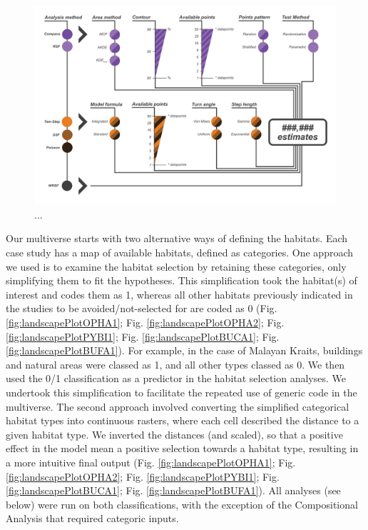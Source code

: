 \documentclass[10pt,a4paper]{article}
\begin{document}
\begin{figure}
\includegraphics[width=1\linewidth]{../ext_images/decisions_visual} \caption{...}\label{fig:decisionsFigure}
\end{figure}

Our multiverse starts with two alternative ways of defining the habitats.
Each case study has a map of available habitats, defined as categories.
One approach we used is to examine the habitat selection by retaining these categories, only simplifying them to fit the hypotheses.
This simplification took the habitat(s) of interest and codes them as 1, whereas all other habitats previously indicated in the studies to be avoided/not-selected for are coded as 0 (Fig. \ref{fig:landscapePlotOPHA1}; Fig. \ref{fig:landscapePlotOPHA2}; Fig. \ref{fig:landscapePlotPYBI1}; Fig. \ref{fig:landscapePlotBUCA1}; Fig. \ref{fig:landscapePlotBUFA1}).
For example, in the case of Malayan Kraits, buildings and natural areas were classed as 1, and all other types classed as 0.
We then used the 0/1 classification as a predictor in the habitat selection analyses.
We undertook this simplification to facilitate the repeated use of generic code in the multiverse.
The second approach involved converting the simplified categorical habitat types into continuous rasters, where each cell described the distance to a given habitat type.
We inverted the distances (and scaled), so that a positive effect in the model mean a positive selection towards a habitat type, resulting in a more intuitive final output (Fig. \ref{fig:landscapePlotOPHA1}; Fig. \ref{fig:landscapePlotOPHA2}; Fig. \ref{fig:landscapePlotPYBI1}; Fig. \ref{fig:landscapePlotBUCA1}; Fig. \ref{fig:landscapePlotBUFA1}).
All analyses (see below) were run on both classifications, with the exception of the Compositional Analysis that required categoric inputs.
\end{document}
